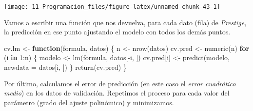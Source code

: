 \documentclass[
]{book}
\newenvironment{Shaded}{\begin{snugshade}}{\end{snugshade}}
\newcommand{\AttributeTok}[1]{\textcolor[rgb]{0.77,0.63,0.00}{#1}}
\newcommand{\ControlFlowTok}[1]{\textcolor[rgb]{0.13,0.29,0.53}{\textbf{#1}}}
\newcommand{\DecValTok}[1]{\textcolor[rgb]{0.00,0.00,0.81}{#1}}
\newcommand{\FunctionTok}[1]{\textcolor[rgb]{0.00,0.00,0.00}{#1}}
\newcommand{\NormalTok}[1]{#1}
\newcommand{\OtherTok}[1]{\textcolor[rgb]{0.56,0.35,0.01}{#1}}
\newcommand{\SpecialCharTok}[1]{\textcolor[rgb]{0.00,0.00,0.00}{#1}}
\theoremstyle{break}
\theoremstyle{nonumberplain}
\begin{document}
\begin{center}\texttt{[image: 11-Programacion\_files/figure-latex/unnamed-chunk-43-1]} \end{center}

Vamos a escribir una función que nos devuelva, para cada dato (fila) de
\emph{Prestige}, la predicción en ese punto ajustando el modelo con todos los demás puntos.

\begin{Shaded}
\begin{Highlighting}[]
\NormalTok{cv.lm }\OtherTok{\textless{}{-}} \ControlFlowTok{function}\NormalTok{(formula, datos) \{}
\NormalTok{      n }\OtherTok{\textless{}{-}} \FunctionTok{nrow}\NormalTok{(datos)}
\NormalTok{      cv.pred }\OtherTok{\textless{}{-}} \FunctionTok{numeric}\NormalTok{(n)}
      \ControlFlowTok{for}\NormalTok{ (i }\ControlFlowTok{in} \DecValTok{1}\SpecialCharTok{:}\NormalTok{n) \{}
\NormalTok{          modelo }\OtherTok{\textless{}{-}} \FunctionTok{lm}\NormalTok{(formula, datos[}\SpecialCharTok{{-}}\NormalTok{i, ])}
\NormalTok{          cv.pred[i] }\OtherTok{\textless{}{-}} \FunctionTok{predict}\NormalTok{(modelo, }\AttributeTok{newdata =}\NormalTok{ datos[i, ])}
\NormalTok{      \}}
      \FunctionTok{return}\NormalTok{(cv.pred)}
\NormalTok{\}}
\end{Highlighting}
\end{Shaded}

Por último, calculamos el error de predicción (en este caso el \emph{error cuadrático medio})
en los datos de validación. Repetimos el proceso para cada valor del parámetro (grado del
ajuste polinómico) y minimizamos.

\begin{Shaded}
\end{Shaded}
\end{document}
